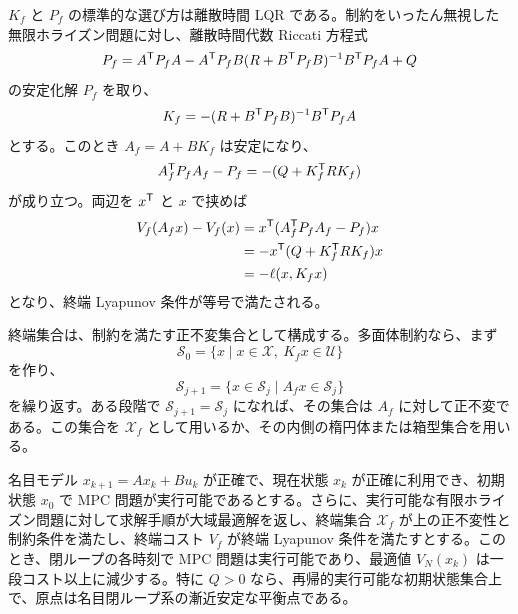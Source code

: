 $K_f$ と $P_f$ の標準的な選び方は離散時間 LQR である。制約をいったん無視した無限ホライズン問題に対し、離散時間代数 Riccati 方程式
\begin{equation}
  P_f=A^{\mathsf{T}} P_fA
  -A^{\mathsf{T}} P_fB(R+B^{\mathsf{T}} P_fB)^{-1}B^{\mathsf{T}} P_fA+Q
\end{equation}
の安定化解 $P_f$ を取り、
\begin{equation}
  K_f=-(R+B^{\mathsf{T}} P_fB)^{-1}B^{\mathsf{T}} P_fA
\end{equation}
とする。このとき $A_f=A+BK_f$ は安定になり、
\begin{equation}
  A_f^{\mathsf{T}} P_fA_f-P_f=-(Q+K_f^{\mathsf{T}} RK_f)
\end{equation}
が成り立つ。両辺を $x^{\mathsf{T}}$ と $x$ で挟めば
\begin{align}
  V_f(A_fx)-V_f(x)
  &=x^{\mathsf{T}}(A_f^{\mathsf{T}} P_fA_f-P_f)x\\
  &=-x^{\mathsf{T}}(Q+K_f^{\mathsf{T}} RK_f)x\\
  &=-\ell(x,K_fx)
\end{align}
となり、終端 Lyapunov 条件が等号で満たされる。

終端集合は、制約を満たす正不変集合として構成する。多面体制約なら、まず
\begin{equation}
  \mathcal{S}_0=\{x\mid x\in\mathcal{X},\ K_fx\in\mathcal{U}\}
\end{equation}
を作り、
\begin{equation}
  \mathcal{S}_{j+1}=\{x\in\mathcal{S}_j\mid A_fx\in\mathcal{S}_j\}
\end{equation}
を繰り返す。ある段階で $\mathcal{S}_{j+1}=\mathcal{S}_j$ になれば、その集合は $A_f$ に対して正不変である。この集合を $\mathcal{X}_f$ として用いるか、その内側の楕円体または箱型集合を用いる。

\begin{theorem}
名目モデル $x_{k+1}=Ax_k+Bu_k$ が正確で、現在状態 $x_k$ が正確に利用でき、初期状態 $x_0$ で MPC 問題が実行可能であるとする。さらに、実行可能な有限ホライズン問題に対して求解手順が大域最適解を返し、終端集合 $\mathcal{X}_f$ が上の正不変性と制約条件を満たし、終端コスト $V_f$ が終端 Lyapunov 条件を満たすとする。このとき、閉ループの各時刻で MPC 問題は実行可能であり、最適値 $V_N(x_k)$ は一段コスト以上に減少する。特に $Q>0$ なら、再帰的実行可能な初期状態集合上で、原点は名目閉ループ系の漸近安定な平衡点である。
\end{theorem}

